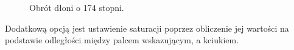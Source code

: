 \begin{figure}[H]
    \centering
    \hfill
    \caption{Obrót dłoni o 174 stopni.}
\end{figure}

\quad Dodatkową opcją jest ustawienie saturacji poprzez obliczenie jej wartości na podstawie odległości między palcem wskazującym, a kciukiem. 

